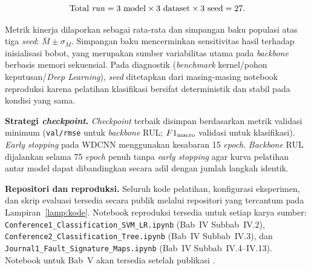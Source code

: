\begin{equation}\label{eq:bab3_totalruns}
  \text{Total \emph{run}} = 3\ \text{model} \times 3\ \text{dataset}
                            \times 3\ \text{seed} = 27.
\end{equation}

Metrik kinerja dilaporkan sebagai rata-rata dan simpangan baku populasi
atas tiga \emph{seed}: $\overline{M} \pm \sigma_M$. Simpangan baku
mencerminkan sensitivitas hasil terhadap inisialisasi bobot, yang merupakan
sumber variabilitas utama pada \emph{backbone} berbasis memori sekuensial.
Pada {\color{blue}diagnostik} (\emph{benchmark} kernel/pohon keputusan/\emph{Deep Learning}),
\emph{seed} ditetapkan dari masing-masing notebook reproduksi karena
pelatihan klasifikasi bersifat deterministik dan stabil pada kondisi yang sama.

\textbf{Strategi \emph{checkpoint}.} \emph{Checkpoint} terbaik disimpan
berdasarkan metrik validasi minimum (\texttt{val/rmse} untuk \emph{backbone}
RUL; $F1_{\rm macro}$ validasi untuk klasifikasi). \emph{Early stopping}
pada WDCNN menggunakan kesabaran 15 \emph{epoch}. \emph{Backbone} RUL
dijalankan selama 75 \emph{epoch} penuh tanpa \emph{early stopping} agar
kurva pelatihan antar model dapat dibandingkan secara adil dengan jumlah
langkah identik.

\textbf{Repositori dan reproduksi.} Seluruh kode pelatihan, konfigurasi
eksperimen, dan skrip evaluasi tersedia secara publik melalui repositori
yang tercantum pada Lampiran~\ref{lamp:kode}. Notebook
reproduksi tersedia untuk setiap karya sumber:
\texttt{Conference1\_Classification\_SVM\_LR.ipynb} (Bab~IV Subbab~IV.2),
\texttt{Conference2\_Classification\_Tree.ipynb} (Bab~IV Subbab~IV.3), dan
\texttt{Journal1\_Fault\_Signature\_Maps.ipynb} (Bab~IV Subbab~IV.4–IV.13).
Notebook untuk Bab~V akan tersedia setelah publikasi
.
